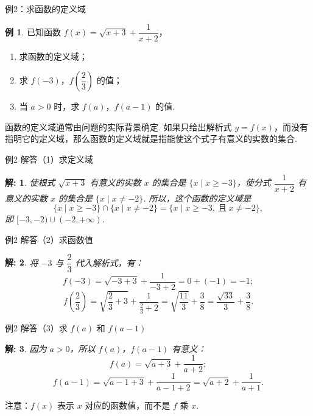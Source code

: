 \documentclass[aspectratio=169,13pt,t] {beamer}
\newtheorem*{solve}{解:}
\theoremstyle{definition}
\newtheorem{exam}{例}
\begin{document}
\begin{frame}{例2：求函数的定义域}
	\begin{exam}
	已知函数 \(f(x) = \sqrt{x+3} + \dfrac{1}{x+2}\)，
	\begin{enumerate}[(1)]
		\item 求函数的定义域；
		\item 求 \(f(-3)\)，\(f\!\left(\dfrac{2}{3}\right)\) 的值；
		\item 当 \(a > 0\) 时，求 \(f(a)\)，\(f(a-1)\) 的值.
	\end{enumerate}
	\end{exam}
	\pause
	\begin{summarybox}[分析]
		函数的定义域通常由问题的实际背景确定. 如果只给出解析式 \(y = f(x)\)，而没有指明它的定义域，那么函数的定义域就是指能使这个式子有意义的实数的集合.
	\end{summarybox}
\end{frame}

\begin{frame}{例2 解答（1）求定义域}
	\begin{solve}
		使根式 \(\sqrt{x+3}\) 有意义的实数 \(x\) 的集合是 \(\{x \mid x \geqslant -3\}\)，使分式 \(\dfrac{1}{x+2}\) 有意义的实数 \(x\) 的集合是 \(\{x \mid x \neq -2\}\).
		\vspace{0.5em}
		所以，这个函数的定义域是
		\[
			\{x \mid x \geqslant -3\} \cap \{x \mid x \neq -2\} = \{x \mid x \geqslant -3,\ \text{且}\ x \neq -2\},
		\]
		即 \([-3, -2) \cup (-2, +\infty)\).
	\end{solve}
\end{frame}

\begin{frame}{例2 解答（2）求函数值}
	\begin{solve}
		将 \(-3\) 与 \(\dfrac{2}{3}\) 代入解析式，有：
		\[
			f(-3) = \sqrt{-3+3} + \frac{1}{-3+2} = 0 + (-1) = -1;
		\]
		\vspace{1em}
		\[
			f\!\left(\frac{2}{3}\right) = \sqrt{\frac{2}{3}+3} + \frac{1}{\frac{2}{3}+2} = \sqrt{\frac{11}{3}} + \frac{3}{8} = \frac{\sqrt{33}}{3} + \frac{3}{8}.
		\]
	\end{solve}
\end{frame}

\begin{frame}{例2 解答（3）求 \(f(a)\) 和 \(f(a-1)\)}
	\begin{solve}
		因为 \(a > 0\)，所以 \(f(a)\)，\(f(a-1)\) 有意义：
		\[
			f(a) = \sqrt{a+3} + \frac{1}{a+2};
		\]
		\vspace{1em}
		\[
			f(a-1) = \sqrt{a-1+3} + \frac{1}{a-1+2} = \sqrt{a+2} + \frac{1}{a+1}.
		\]
	\end{solve}
	\vspace{1em}
	\pause
	\begin{summarybox-answer}
		注意：\(f(x)\) 表示 \(x\) 对应的函数值，而不是 \(f\) 乘 \(x\).
	\end{summarybox-answer}
\end{frame}
\end{document}
